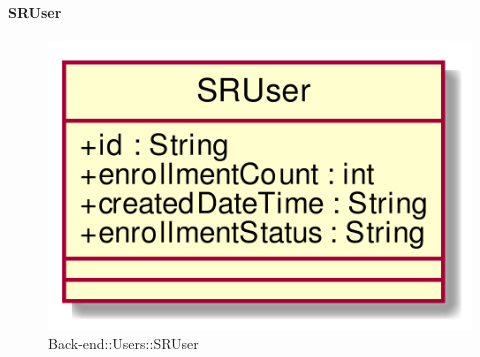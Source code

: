 \hypertarget{SRUser_label}{\paragraph{SRUser}}
\begin{figure}[h]
	\centering
	\includegraphics[width=\textwidth,height=\textheight,keepaspectratio]{images/ClassSRUser.png}
	\caption{Back-end::Users::SRUser}
\end{figure}
